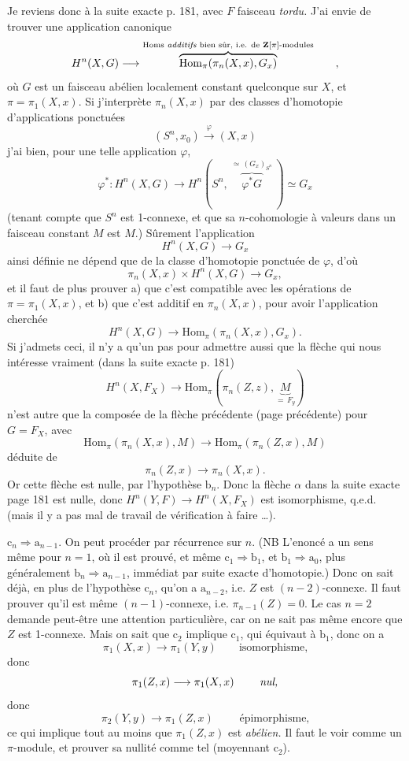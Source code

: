 \documentclass[11pt]{article}
\newcommand{\printedpage}[1]{{\reversemarginpar\marginnote{\raggedleft\scriptsize ed.~#1}}}
\newcommand{\msp}[1]{\marginpar{\raggedright\scriptsize ms.~#1}}
\begin{document}
Je reviens donc à la suite exacte p. 181, avec $F$ faisceau \textit{tordu.} J’ai envie de trouver une application canonique
\[
H^n(X,G) \longrightarrow \overbrace{\mathrm{Hom}_\pi(\pi_n(X,x),G_x)}^{\text{\scriptsize Homs \textit{additifs} bien sûr, i.e. de $\mathbf{Z}[\pi]$-modules}} \qquad ,
\]
où $G$ est un faisceau abélien localement constant quelconque sur $X$, et $\pi = \pi_1(X,x)$. Si j’interprète
\msp{page 184}
$\pi_n(X,x)$ par des classes d’homotopie d’applications ponctuées
\[
(S^n,x_0) \xrightarrow{\ \varphi\ } (X,x)
\]
j’ai bien, pour une telle application $\varphi$,
\[
\varphi^* : H^n(X,G) \longrightarrow H^n(S^n,\ \overbrace{\varphi^*G}^{\simeq\,(G_x)_{S^n}}\ ) \simeq G_x
\]
(tenant compte que $S^n$ est 1-connexe, et que sa $n$-cohomologie à valeurs dans un faisceau constant $M$ est $M$.) Sûrement l’application
\[
H^n(X,G) \longrightarrow G_x
\]
\printedpage{123}
ainsi définie ne dépend que de la classe d’homotopie ponctuée de $\varphi$, d’où
\[
\pi_n(X,x) \times H^n(X,G) \longrightarrow G_x,
\]
et il faut de plus prouver a) que c’est compatible avec les opérations de $\pi = \pi_1(X,x)$, et b) que c’est additif en $\pi_n(X,x)$, pour avoir l’application cherchée
\[
H^n(X,G) \longrightarrow \mathrm{Hom}_\pi(\pi_n(X,x),G_x).
\]
Si j’admets ceci, il n’y a qu’un pas pour admettre aussi que la flèche qui nous intéresse vraiment (dans la suite exacte p. 181)
\msp{page 185}
\[
H^n(X,F_X) \longrightarrow \mathrm{Hom}_\pi(\pi_n(Z,z),\underbrace{M}_{=\,F_y})
\]
n’est autre que la composée de la flèche précédente (page précédente) pour $G = F_X$, avec
\[
\mathrm{Hom}_\pi(\pi_n(X,x),M) \longrightarrow \mathrm{Hom}_\pi(\pi_n(Z,x),M)
\]
déduite de
\[
\pi_n(Z,x) \longrightarrow \pi_n(X,x).
\]
Or cette flèche est nulle, par l’hypothèse $\mathrm{b}_n$. Donc la flèche $\alpha$ dans la suite exacte page 181 est nulle, donc $H^n(Y,F) \longrightarrow H^n(X,F_X)$ est isomorphisme, q.e.d. (mais il y a pas mal de travail de vérification à faire \dots).

$\mathrm{c}_n \Longrightarrow \mathrm{a}_{n-1}$. On peut procéder par récurrence sur $n$. (NB L’enoncé a un sens même pour $n=1$, où il est prouvé, et même $\mathrm{c}_1 \Longrightarrow \mathrm{b}_1$, et $\mathrm{b}_1 \Longrightarrow \mathrm{a}_0$, plus généralement $\mathrm{b}_n \Longrightarrow \mathrm{a}_{n-1}$, immédiat par suite exacte d’homotopie.) Donc on sait déjà, en plus de l’hypothèse $\mathrm{c}_n$, qu’on a $\mathrm{a}_{n-2}$, i.e. $Z$ est $(n-2)$-connexe. Il faut prouver qu’il est même $(n-1)$-connexe, i.e. $\pi_{n-1}(Z)=0$. Le cas $n=2$ demande %
\msp{page 186}
peut-être une attention particulière, car on ne sait pas même encore que $Z$ est 1-connexe. Mais on sait que $\mathrm{c}_2$ implique $\mathrm{c}_1$, qui équivaut à $\mathrm{b}_1$, donc on a
\[
\pi_1(X,x) \longrightarrow \pi_1(Y,y) \qquad \text{isomorphisme,}
\]
donc
\[
\pi_1(Z,x) \longrightarrow \pi_1(X,x) \qquad \text{ \textit{nul,}}
\]
donc
\[
\pi_2(Y,y) \longrightarrow \pi_1(Z,x) \qquad \text{ épimorphisme,}
\]
ce qui implique tout au moins que $\pi_1(Z,x)$ est \textit{abélien.} Il faut le voir comme un $\pi$-module, et prouver sa nullité comme tel (moyennant $\mathrm{c}_2$).
\end{document}

